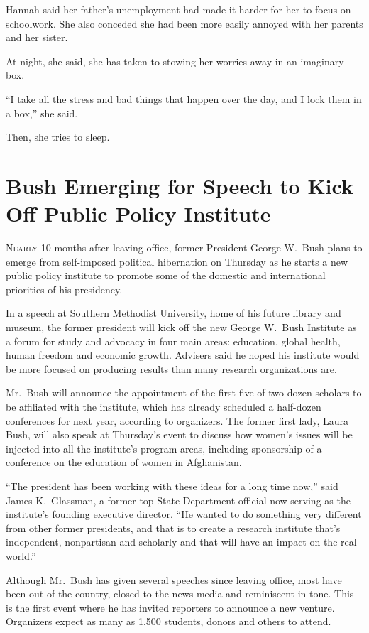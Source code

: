 ﻿\documentclass[12pt]{article}
\begin{document}
Hannah said her father's unemployment had made it harder for her to focus on schoolwork. She also
conceded she had been more easily annoyed with her parents and her sister.

At night, she said, she has taken to stowing her worries away in an imaginary box.

``I take all the stress and bad things that happen over the day, and I lock them in a box,'' she
said.

Then, she tries to sleep.

\section{Bush Emerging for Speech to Kick Off Public Policy Institute}

\lettrine{N}{early} 10 months after leaving office, former President George
W.~Bush plans to emerge from self-imposed political hibernation on Thursday as he starts a new
public policy institute to promote some of the domestic and international priorities of his
presidency.

In a speech at Southern Methodist University, home of his future library and museum, the former
president will kick off the new George W.~Bush Institute as a forum for study and advocacy in four
main areas: education, global health, human freedom and economic growth. Advisers said he hoped his
institute would be more focused on producing results than many research organizations are.

Mr.~Bush will announce the appointment of the first five of two dozen scholars to be affiliated with
the institute, which has already scheduled a half-dozen conferences for next year, according to
organizers. The former first lady, Laura Bush, will also speak at Thursday's event to discuss how
women's issues will be injected into all the institute's program areas, including sponsorship of a
conference on the education of women in Afghanistan.

``The president has been working with these ideas for a long time now,'' said James K.~Glassman, a
former top State Department official now serving as the institute's founding executive director.
``He wanted to do something very different from other former presidents, and that is to create a
research institute that's independent, nonpartisan and scholarly and that will have an impact on the
real world.''

Although Mr.~Bush has given several speeches since leaving office, most have been out of the
country, closed to the news media and reminiscent in tone. This is the first event where he has
invited reporters to announce a new venture. Organizers expect as many as 1,500 students, donors and
others to attend.
\end{document}

